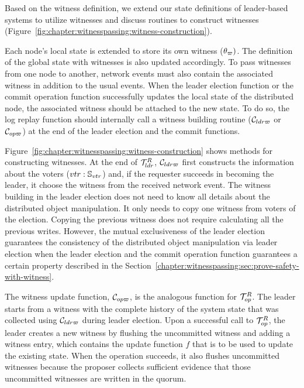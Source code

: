 Based on the witness definition, we extend our state definitions of
leader-based systems to utilize witnesses and discuss routines to construct
witnesses (Figure~\ref{fig:chapter:witnesspassing:witness-construction}).

Each node's local state is extended to store its own witness ($\theta_\varpi)$.
The definition of the global state with witnesses is also updated accordingly.
To pass witnesses from one node to another,
network events must also contain the associated witness in addition to the usual events.
When the leader election function or the commit operation function successfully updates the local state of the distributed node, the associated witness should be
attached to the new state. To do so, the log replay function should internally call a witness building routine ($\mathcal{C}_{ldr\varpi}$ or $\mathcal{C}_{op\varpi}$) at the end of the
leader election and the commit functions.

Figure~\ref{fig:chapter:witnesspassing:witness-construction} shows methods for constructing witnesses.
At the end of $\mathcal{T}^{R}_{ldr}$, $\mathcal{C}_{ldr\varpi}$ first constructs the information about the
voters ($vtr:\mathbb{S}_{vtr}$) and, if the requester succeeds in becoming the leader,
it choose the witness from the received network event. 
The witness building in the leader election does not need to know 
all details about the distributed object manipulation.
It only needs to copy one witness from voters of the election.
Copying the previous witness does not require calculating all the previous writes. 
However, the mutual exclusiveness of the leader election guarantees the consistency of the distributed object manipulation via leader election when the leader election and the commit operation function guarantees a 
 certain property described in the Section~\ref{chapter:witnesspassing:sec:prove-safety-with-witness}. 
 
The witness update function, $\mathcal{C}_{op\varpi}$, is the analogous function for $\mathcal{T}^{R}_{op}$.
The leader starts from a witness with the complete history of the system state
that was collected using $\mathcal{C}_{ldr\varpi}$ during leader election.
Upon a successful call to $\mathcal{T}^{R}_{op}$, the leader creates a new witness by flushing the uncommitted witness and 
adding a witness entry, which contains the update function $f$ that is to be used
to update the existing state.
When the operation succeeds, it also flushes uncommitted witnesses because the proposer collects  sufficient evidence that those uncommitted witnesses are written in the quorum.  

